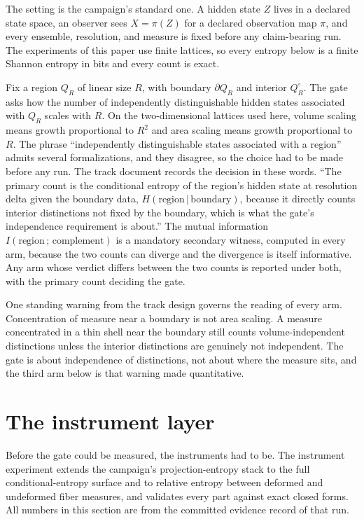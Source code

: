 \documentclass[aps,pre,reprint,nofootinbib]{revtex4-2}
\begin{document}
The setting is the campaign's standard one.  A hidden state $Z$ lives in
a declared state space, an observer sees $X = \pi(Z)$ for a declared
observation map $\pi$, and every ensemble, resolution, and measure is
fixed before any claim-bearing run.  The experiments of this paper use
finite lattices, so every entropy below is a finite Shannon entropy in
bits and every count is exact.

Fix a region $Q_R$ of linear size $R$, with boundary $\partial Q_R$ and
interior $Q_R^{\circ}$.  The gate asks how the number of independently
distinguishable hidden states associated with $Q_R$ scales with $R$.  On
the two-dimensional lattices used here, volume scaling means growth
proportional to $R^2$ and area scaling means growth proportional to $R$.
The phrase ``independently distinguishable states associated with a
region'' admits several formalizations, and they disagree, so the choice
had to be made before any run.  The track document records the decision
in these words.  ``The primary count is the conditional entropy of the
region's hidden state at resolution delta given the boundary data,
$H(\text{region}\,|\,\text{boundary})$, because it directly counts
interior distinctions not fixed by the boundary, which is what the gate's
independence requirement is about.''  The mutual information
$I(\text{region}\,;\,\text{complement})$ is a mandatory secondary
witness, computed in every arm, because the two counts can diverge and
the divergence is itself informative.  Any arm whose verdict differs
between the two counts is reported under both, with the primary count
deciding the gate.

One standing warning from the track design governs the reading of every
arm.  Concentration of measure near a boundary is not area scaling.  A
measure concentrated in a thin shell near the boundary still counts
volume-independent distinctions unless the interior distinctions are
genuinely not independent.  The gate is about independence of
distinctions, not about where the measure sits, and the third arm below
is that warning made quantitative.

\section{The instrument layer}
\label{sec:eg0}

Before the gate could be measured, the instruments had to be.  The
instrument experiment extends the campaign's projection-entropy stack
\cite{EntropyPaper,SourcesPaper} to the full conditional-entropy surface
and to relative entropy between deformed and undeformed fiber measures,
and validates every part against exact closed forms.  All numbers in this
section are from the committed evidence record of that run.
\end{document}
